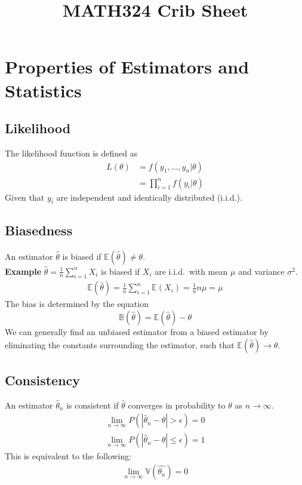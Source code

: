 \documentclass[sn-mathphys,Numbered]{sn-jnl}%
\newcommand{\Var}{\mathbb{V}}
\newcommand{\E}{\mathbb{E}}
\newcommand{\Bias}{\mathbb{B}}
\newcommand{\Example}{\textbf{Example }}
\begin{document}
\title[MATH324]{MATH324 Crib Sheet}

\author{ }

\maketitle
\newpage

\section{Properties of Estimators and Statistics}
\subsection{Likelihood}
The likelihood function is defined as
\begin{align}
    L(\theta) & = f(y_1, \ldots, y_n | \theta)  \nonumber \\
              & = \prod_{i=1}^n f(y_i | \theta)
\end{align}
Given that $y_i$ are independent and identically distributed (i.i.d.).
\subsection{Biasedness}\label{biasedness}
An estimator $\hat{\theta}$ is biased if $\E(\hat{\theta}) \neq \theta$.\\
\Example $\hat{\theta} = \frac{1}{n} \sum_{i=1}^n X_i$ is biased if $X_i$ are
i.i.d.\ with mean $\mu$ and variance $\sigma^2$.
\begin{align}
    \E ( \hat{\theta} ) = \frac{1}{n} \sum_{i=1}^n \E (X_i
    ) = \frac{1}{n} n \mu = \mu
\end{align}
The bias is determined by the equation
\begin{equation}
    \Bias ( \hat{\theta} ) = \E ( \hat{\theta} ) - \theta
\end{equation}
We can generally find an unbiased estimator from a biased estimator by eliminating
the constants surrounding the estimator, such that $\E(\hat{\theta}) \to \theta$.

\subsection{Consistency}\label{consistency}
An estimator $\hat{\theta}_n$ is consistent if $\hat{\theta}$ converges in
probability to $\theta$ as $n \rightarrow \infty$.
\begin{align}
    \lim_{n \rightarrow \infty} P(|\hat{\theta}_n - \theta| > \epsilon) = 0 \\
    \lim_{n \rightarrow \infty} P(|\hat{\theta}_n - \theta| \leq \epsilon) = 1
\end{align}
This is equivalent to the following:
\begin{align}
    \lim_{n \to \infty} \Var ( \hat{\theta_n} ) = 0
\end{align}
\end{document}

